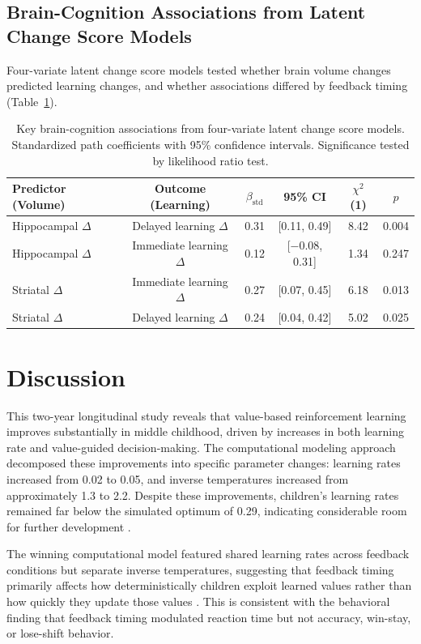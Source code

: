 \documentclass[11pt]{article}
\begin{document}
\subsection{Brain-Cognition Associations from Latent Change Score Models}

Four-variate latent change score models tested whether brain volume changes predicted learning changes, and whether associations differed by feedback timing (Table~\ref{tab:lcs}).

\begin{table}[H]
\centering
\caption{Key brain-cognition associations from four-variate latent change score models. Standardized path coefficients with 95\% confidence intervals. Significance tested by likelihood ratio test.}
\label{tab:lcs}
\begin{tabular}{lccccc}
\toprule
\textbf{Predictor (Volume)} & \textbf{Outcome (Learning)} & \textbf{$\beta_{\mathrm{std}}$} & \textbf{95\% CI} & \textbf{$\chi^2$(1)} & \textbf{$p$} \\
\midrule
Hippocampal $\Delta$ & Delayed learning $\Delta$ & 0.31 & [0.11, 0.49] & 8.42 & 0.004 \\
Hippocampal $\Delta$ & Immediate learning $\Delta$ & 0.12 & [$-0.08$, 0.31] & 1.34 & 0.247 \\
Striatal $\Delta$ & Immediate learning $\Delta$ & 0.27 & [0.07, 0.45] & 6.18 & 0.013 \\
Striatal $\Delta$ & Delayed learning $\Delta$ & 0.24 & [0.04, 0.42] & 5.02 & 0.025 \\
\bottomrule
\end{tabular}
\end{table}

\section{Discussion}

This two-year longitudinal study reveals that value-based reinforcement learning improves substantially in middle childhood, driven by increases in both learning rate and value-guided decision-making. The computational modeling approach decomposed these improvements into specific parameter changes: learning rates increased from 0.02 to 0.05, and inverse temperatures increased from approximately 1.3 to 2.2. Despite these improvements, children's learning rates remained far below the simulated optimum of 0.29, indicating considerable room for further development \citep{niv2009, daw2011}.

The winning computational model featured shared learning rates across feedback conditions but separate inverse temperatures, suggesting that feedback timing primarily affects how deterministically children exploit learned values rather than how quickly they update those values \citep{palminteri2016}. This is consistent with the behavioral finding that feedback timing modulated reaction time but not accuracy, win-stay, or lose-shift behavior.
\end{document}
